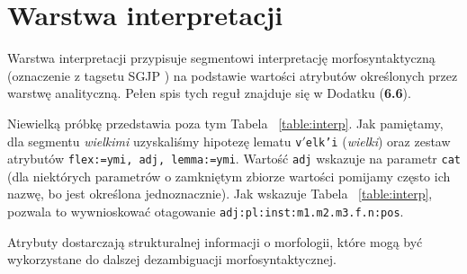 \documentclass{article}
\begin{document}
\section{Warstwa interpretacji}

Warstwa interpretacji przypisuje segmentowi interpretację morfosyntaktyczną (oznaczenie z tagsetu SGJP \cite{sgjp}) na podstawie wartości atrybutów
określonych przez warstwę analityczną.
Pełen spis tych reguł znajduje się w Dodatku (\textbf{6.6}).

Niewielką próbkę przedstawia poza tym Tabela ~\ref{table:interp}. Jak pamiętamy, dla segmentu \textit{wielkimi} uzyskaliśmy hipotezę lematu \texttt{v$'$elk'i} (\textit{wielki}) oraz zestaw atrybutów \texttt{flex:=ymi, adj, lemma:=ymi}. Wartość \texttt{adj} wskazuje na parametr \texttt{cat} (dla niektórych parametrów o zamkniętym zbiorze wartości pomijamy często ich nazwę, bo jest określona jednoznacznie). Jak wskazuje Tabela ~\ref{table:interp}, pozwala to wywnioskować otagowanie \texttt{adj:pl:inst:m1.m2.m3.f.n:pos}.

Atrybuty dostarczają strukturalnej informacji o morfologii, które mogą być wykorzystane do dalszej dezambiguacji morfosyntaktycznej.
\end{document}
